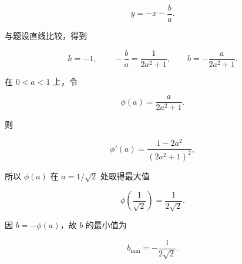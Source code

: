 \begin{answer}
\nopagebreak[4]
\[
y=-x-\frac ba.
\]

与题设直线比较，得到

\nopagebreak[4]
\[
k=-1,\qquad
-\frac ba=\frac1{2a^2+1},
\qquad
b=-\frac a{2a^2+1}.
\]

在 $0<a<1$ 上，令

\nopagebreak[4]
\[
\phi(a)=\frac a{2a^2+1}.
\]

则

\nopagebreak[4]
\[
\phi'(a)=\frac{1-2a^2}{(2a^2+1)^2},
\]

所以 $\phi(a)$ 在 $a=1/\sqrt2$ 处取得最大值

\nopagebreak[4]
\[
\phi\left(\frac1{\sqrt2}\right)=\frac1{2\sqrt2}.
\]

因 $b=-\phi(a)$，故 $b$ 的最小值为

\nopagebreak[4]
\[
b_{\min}=-\frac1{2\sqrt2}.
\]




\end{answer}